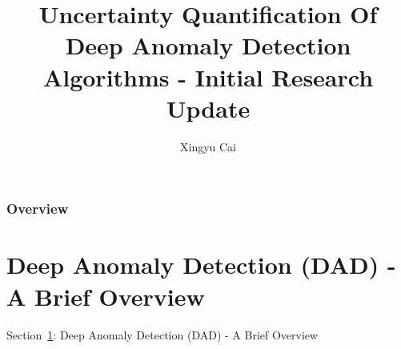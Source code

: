 \documentclass{beamer}
\title[HSB]{Uncertainty Quantification Of Deep Anomaly Detection Algorithms - Initial Research Update} %
\author[X. Cai]{Xingyu Cai} %
\institute[HSB] %
{
The Hartford Steam Boiler Inspection and Insurance Company \\%
\medskip
}
\begin{document}
\begin{frame}
\titlepage %
\end{frame}


\begin{frame}
\frametitle{Overview} %
\footnotesize
\tableofcontents %
\end{frame}


\section{Deep Anomaly Detection (DAD) - A Brief Overview}
\label{sec-review}
\begin{frame}
\centerline{Section~\ref{sec-review}: Deep Anomaly Detection (DAD) - A Brief Overview}
\end{frame}
\end{document}
